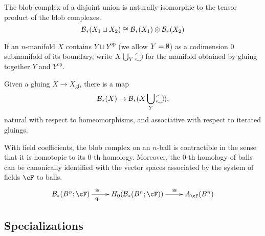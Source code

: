 \documentclass{pnastwo}
\begin{document}
\begin{article}
\begin{property}
\label{property:disjoint-union}
The blob complex of a disjoint union is naturally isomorphic to the tensor product of the blob complexes.
\begin{equation*}
{\mathcal B}_*(X_1 \sqcup X_2) \cong {\mathcal B}_*(X_1) \otimes {\mathcal B}_*(X_2)
\end{equation*}
\end{property}

If an $n$-manifold $X$ contains $Y \sqcup Y^\text{op}$ (we allow $Y = \emptyset$) as a codimension $0$ submanifold of its boundary, 
write $X \bigcup_{Y}\selfarrow$ for the manifold obtained by gluing together $Y$ and $Y^\text{op}$.
\begin{property}
\label{property:gluing-map}%
Given a gluing $X \to X_\mathrm{gl}$, there is
a map
\[
	\bc_*(X) \to \bc_*(X \bigcup_{Y}\selfarrow),
\]
natural with respect to homeomorphisms, and associative with respect to iterated gluings.
\end{property}

\begin{property}[Contractibility]
\label{property:contractibility}%
With field coefficients, the blob complex on an $n$-ball is contractible in the sense 
that it is homotopic to its $0$-th homology.
Moreover, the $0$-th homology of balls can be canonically identified with the vector spaces 
associated by the system of fields $\cF$ to balls.
\begin{equation*}
\xymatrix{\bc_*(B^n;\cF) \ar[r]^(0.4){\iso}_(0.4){\text{qi}} & H_0(\bc_*(B^n;\cF)) \ar[r]^(0.6)\iso & A_\cF(B^n)}
\end{equation*}
\end{property}


\subsection{Specializations}
\label{sec:specializations}


\end{article}
\end{document}
